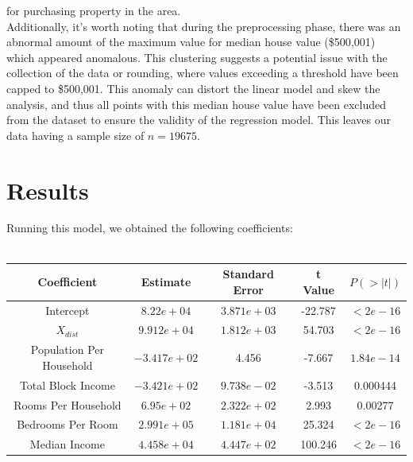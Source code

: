 \documentclass[10pt]{article}
\begin{document}
for purchasing property in the area.\\
\hspace*{2em} Additionally, it's worth noting that during the preprocessing phase, there was an abnormal amount of the maximum value for median house value (\$500,001) which appeared anomalous.
This clustering
suggests a potential issue with the collection of the data or rounding, where values exceeding a threshold have been capped to \$500,001. This anomaly
can distort the linear model and skew the analysis, and thus all points with this median house value have been excluded from the dataset to ensure
the validity of the regression model. This leaves our data having a sample size of $n = 19675$.


\section{Results}
Running this model, we obtained the following coefficients:\\\\
\begin{center}
\begin{adjustbox}{scale=1}
    \begin{tabular}{|c|c|c|c|c|}
        \hline
        Coefficient & Estimate & Standard Error & t Value & $P(>|t|)$\\
        \hline
        Intercept & $8.22e+04$ & $3.871e+03$ & -22.787 & $< 2e-16$ \\
        \hline
        $X_{dist}$ & $9.912e+04$ & $1.812e+03$ & 54.703 & $< 2e-16$ \\
        \hline
        Population Per Household & $-3.417e+02$ & 4.456 & -7.667 & $1.84e-14$\\
        \hline
        Total Block Income & $-3.421e+02$ & $9.738e-02$ & -3.513 & 0.000444\\
        \hline
        Rooms Per Household & $6.95e+02$ & $2.322e+02$ & 2.993 & 0.00277 \\
        \hline
        Bedrooms Per Room & $2.991e+05$ & $1.181e+04$ & 25.324 & $< 2e-16$ \\
        \hline
        Median Income & $4.458e+04$ & $4.447e+02$ & 100.246 & $< 2e-16$\\
        \hline
    \end{tabular}
\end{adjustbox}
\end{center}
\end{document}
